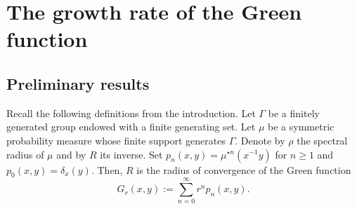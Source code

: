 \documentclass{amsart}
\newtheorem{lem}[thm]{Lemma}
\theoremstyle{definition}
\theoremstyle{remark}
\newcommand{\Hdim}{{\rm Hdim}}
\newcommand{\diam }[1]{{\textbf{diam}\big(#1\big)}}
\begin{document}

\section{The growth rate of the Green function}\label{SectiongrowthrateGreenfunction}


\subsection{Preliminary results}
Recall the following definitions from the introduction.
Let $\Gamma$ be a finitely generated group endowed with a finite generating set.
Let $\mu$ be a symmetric
probability measure whose finite support generates $\Gamma$. Denote by $\rho$ the spectral
radius of $\mu$ and by $R$ its inverse.
Set $p_n(x,y)=\mu^{\star n}(x^{-1}y)$ for $n\ge 1$ and $p_0(x,y)=\delta_x(y)$. Then, $R$ is the radius of convergence of the
Green function
$$
G_r(x, y) :=\sum_{n=0}^\infty r^np_n(x,y).
$$
 
\end{document}
